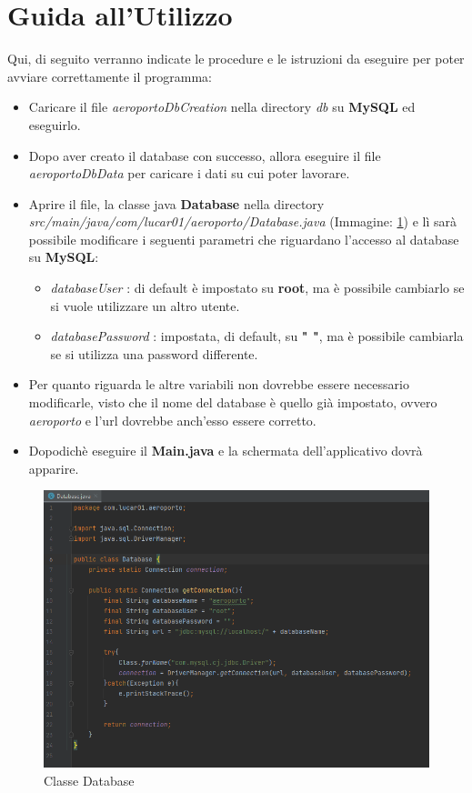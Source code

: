 
\newpage

\enlargethispage{1\linewidth}

\section{Guida all'Utilizzo}

\textsf{\small Qui, di seguito verranno indicate le procedure e le istruzioni da eseguire per poter avviare correttamente il programma: } \\

\begin{itemize}
	\item \textsf{\small Caricare il file \emph{aeroportoDbCreation} nella directory \emph{db} su \textbf{MySQL} ed eseguirlo.}
	\item \textsf{\small Dopo aver creato il database con successo, allora eseguire il file \emph{aeroportoDbData} per caricare i dati su cui poter lavorare.}
	\item \textsf{\small Aprire il file, la classe java \textbf{Database} nella directory \emph{src/main/java/com/lucar01/aeroporto/Database.java} (Immagine: \ref{fig:database}) e lì sarà possibile modificare i seguenti parametri che riguardano l'accesso al database su \textbf{MySQL}: }
	\begin{itemize}
		\item \textsf{\small \emph{databaseUser} : di default è impostato su \textbf{root}, ma è possibile cambiarlo se si vuole utilizzare un altro utente.}
		\item \textsf{\small \emph{databasePassword} : impostata, di default, su \textbf{" "}, ma è possibile cambiarla se si utilizza una password differente.}
	\end{itemize}
	\item \textsf{\small Per quanto riguarda le altre variabili non dovrebbe essere necessario modificarle, visto che il nome del database è quello già impostato, ovvero \emph{aeroporto} e l'url dovrebbe anch'esso essere corretto.}
	\item \textsf{\small Dopodichè eseguire il \textbf{Main.java} e la schermata dell'applicativo dovrà apparire.}
\end{itemize}

\begin{figure}[ht] 
	\centering
	\includegraphics[width=1\textwidth, height=1\textheight, keepaspectratio]{./img/Applicativo/database_class.png}
	\caption{Classe Database}
	\label{fig:database}
\end{figure}
